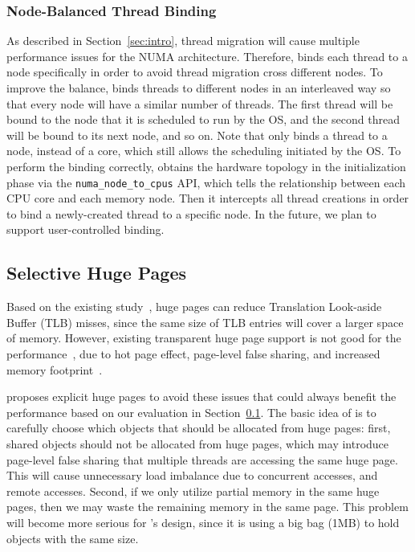 \subsubsection{Node-Balanced Thread Binding} 
As described in Section~\ref{sec:intro}, thread migration will cause multiple performance issues for the NUMA architecture. Therefore, \NM{} binds each thread to a node specifically in order to avoid thread migration cross different nodes. To improve the balance, \NM{} binds threads to different nodes in an interleaved way so that every node will have a similar number of threads. The first thread will be bound to the node that it is scheduled to run by the OS, and the second thread will be bound to its next node, and so on. Note that \NM{} only binds a thread to a node, instead of a core, which still allows the scheduling initiated by the OS. To perform the binding correctly, \NM{} obtains the hardware topology in the initialization phase via the \texttt{numa\_node\_to\_cpus} API, which tells the relationship between each CPU core and each memory node. Then it intercepts all thread creations in order to bind a newly-created thread to a specific node. In the future, we plan to support user-controlled binding.

\subsection{Selective Huge Pages} 
\label{sec:hugepage}

 Based on the existing study~\citep{hugepages}, huge pages can reduce Translation Look-aside Buffer (TLB) misses, since the same size of TLB entries will cover a larger space of memory. However, existing transparent huge page support is not good for the performance~\citep{Gaud:2014:LPM:2643634.2643659, DBLP:conf/asplos/PanwarBG19}, due to hot page effect, page-level false sharing, and increased memory footprint~\citep{DBLP:conf/asplos/MaasAIJMR20}.
 
\NM{} proposes explicit huge pages to avoid these issues that could always benefit the performance based on our evaluation in Section~\ref{sec:hugepage}. The basic idea of \NM{} is to carefully choose which objects that should be allocated from huge pages: first, shared objects should not be allocated from huge pages, which may introduce page-level false sharing that multiple threads are accessing the same huge page. This will cause unnecessary load imbalance due to concurrent accesses, and remote accesses. Second, if we only utilize partial memory in the same huge pages, then we may waste the remaining memory in the same page. This problem will become more serious for \NM{}'s design, since it is using a big bag (1MB) to hold objects with the same size. 

